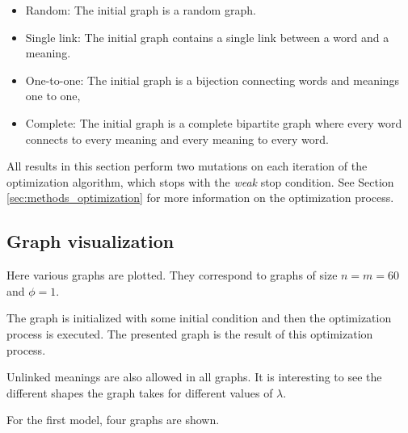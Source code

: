 \begin{redenv}
  \begin{itemize}
  \item Random: The initial graph is a  random graph.
  \item Single link: The initial graph contains a single link between a word and a meaning. 
  \item One-to-one: The initial graph is a bijection connecting words and meanings one to one,
  \item Complete: The initial graph is a complete bipartite graph where every word connects to every meaning and every meaning to every word. 
  \end{itemize}
\end{redenv}

All results in this section perform two mutations on each iteration of the optimization algorithm, which stops with the \emph{weak} stop condition.
See Section \ref{sec:methods_optimization} for more information on the optimization process.

\subsection{Graph visualization}
\label{sec:results_new_graph}

Here various graphs are plotted.
They correspond to graphs of size $n=m=60$ and $\phi=1$.
\begin{redenv}
  The graph is initialized with some initial condition and then the optimization process is executed.
  The presented graph is the result of this optimization process.
\end{redenv}
Unlinked meanings are also allowed in all graphs.
It is interesting to see the different shapes the graph takes for different values of $\lambda$.

For the first model, four graphs are shown.

